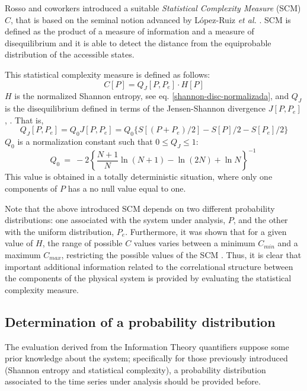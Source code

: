 Rosso and coworkers \cite{Lamberti2004} introduced a suitable \textit{Statistical Complexity Measure} (SCM) $C$, that is  based on the seminal notion advanced by L\'opez-Ruiz {\it et al.} \cite{Lopez-Ruiz1995}. SCM is defined as the product of a measure of information and a measure of disequilibrium  and it is able to detect the distance from the equiprobable distribution of the accessible states.

This statistical complexity measure \cite{Martin2003,Lamberti2004} is defined as follows: 
\begin{equation}
C[P] = Q_{J}[P,P_e] \cdot H[P]
\label{complexity}
\end{equation}
$H$ is the normalized Shannon entropy, see eq. \ref{shannon-disc-normalizada}, and $Q_{J}$ is the disequilibrium  defined in terms of the Jensen-Shannon divergence $J[P, P_e]$, \cite{Grosse2002}.
That is,
\begin{equation}
\label{disequilibrium}	
Q_{J} [ P, P_e] = Q_{0} J[ P, P_e] = Q_{0} \{ S[(P + P_e)/2 ] - S[ P ]/2 - S[P_e]/2\}
\end{equation}
$Q_0$ is a normalization constant such that $0 \leq Q_{J} \leq 1$:
\begin{equation}
Q_0 ~=~ -2 \left\{ {\frac{N+1}{N}} \ln (N+1) - \ln (2N) + \ln N \right\}^{-1} \
\label{q0-jensen-1}
\end{equation}
This value is obtained in a totally deterministic situation, where only one components of $P$ has a no null value equal to one.

Note that the above introduced SCM depends on two different probability distributions: one associated with the system under analysis, $P$, and the other with the uniform distribution, $P_e$.
Furthermore, it was shown that for a given value of $H$, the range of possible $C$ values varies between a minimum $C_{min}$ and a maximum $C_{max}$, restricting the possible values of the SCM \cite{Martin2006}.
Thus, it is clear that important additional information related to the correlational structure between the components of the physical system is provided by evaluating the statistical complexity measure. 

\subsection{Determination of a probability distribution}

The evaluation derived from the  Information Theory quantifiers suppose some prior knowledge about the system; specifically for those previously introduced (Shannon entropy and statistical complexity), a probability distribution associated to the time series under analysis should be provided before.


